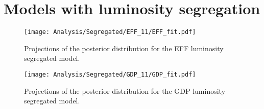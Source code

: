 \section{Models with luminosity segregation}
\label{sect:app_segregated}
\begin{center}

\end{center}

\begin {figure}
 \centering
 \texttt{[image: Analysis/Segregated/EFF\_11/EFF\_fit.pdf]}
  \caption{Projections of the posterior distribution for the EFF luminosity segregated model.}
\label{fig:EFFSeg}
\end {figure}

\begin {figure}
 \centering
 \texttt{[image: Analysis/Segregated/GDP\_11/GDP\_fit.pdf]}
  \caption{Projections of the posterior distribution for the GDP luminosity segregated model.}
\label{fig:GDPSeg}
\end {figure}

